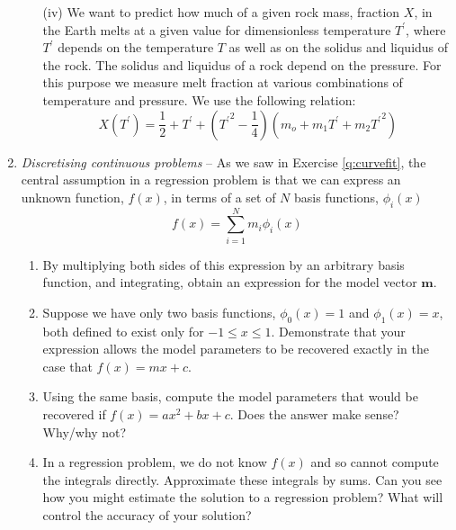 \documentclass[a4paper,11pt]{article}
\begin{document}
\begin{enumerate}
\begin{enumerate}
   \item[(iv)] We want to predict how much of a given rock mass, fraction $X$, in the Earth melts at a given value for dimensionless temperature $T^{\prime}$, where $T^{\prime}$ depends on the temperature $T$ as well as on the solidus and liquidus of the rock. The solidus and liquidus of a rock depend on the pressure. For this purpose we measure melt fraction at various combinations of temperature and pressure. We use the following relation: 
\begin{equation*}
X(T^{\prime}) = \frac{1}{2} + T^{\prime} + \left({T^{\prime}}^2 - \frac{1}{4}\right)(m_o + m_1T^{\prime} + m_2{T^{\prime}}^2)
\end{equation*}

\end{enumerate}
\item \textit{Discretising continuous problems} -- As we saw in Exercise \ref{q:curvefit}, the central assumption in a regression problem is that we can express an unknown function, $f(x)$, in terms of a set of $N$ basis functions, $\phi_i(x)$ 
\[f(x) = \sum_{i=1}^N m_i \phi_i(x)\] 
\begin{enumerate}
\item By multiplying both sides of this expression by an arbitrary basis function, and integrating, obtain an expression for the model vector $\mathbf{m}$. 
\item Suppose we have only two basis functions, $\phi_0(x)=1$ and $\phi_1(x) = x$, both defined to exist only for $-1\le x\le1$. Demonstrate that your expression allows the model parameters to be recovered exactly in the case that $f(x) = mx + c$.
\item Using the same basis, compute the model parameters that would be recovered if $f(x) = a x^2 + bx+c$. Does the answer make sense? Why/why not?
\item\label{q:disc} In a regression problem, we do not know $f(x)$ and so cannot compute the integrals directly. Approximate these integrals by sums. Can you see how you might estimate the solution to a regression problem? What will control the accuracy of your solution?   \end{enumerate}
\end{enumerate}

 
\end{document}
